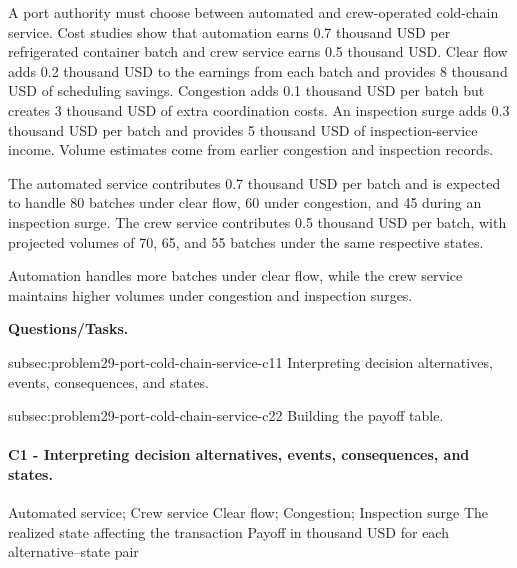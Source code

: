 	A port authority must choose between automated and crew-operated cold-chain service. Cost studies show that automation earns 0.7 thousand USD per refrigerated container batch and crew service earns 0.5 thousand USD. Clear flow adds 0.2 thousand USD to the earnings from each batch and provides 8 thousand USD of scheduling savings. Congestion adds 0.1 thousand USD per batch but creates 3 thousand USD of extra coordination costs. An inspection surge adds 0.3 thousand USD per batch and provides 5 thousand USD of inspection-service income. Volume estimates come from earlier congestion and inspection records.
	
	The automated service contributes 0.7 thousand USD per batch and is expected to handle 80 batches under clear flow, 60 under congestion, and 45 during an inspection surge. The crew service contributes 0.5 thousand USD per batch, with projected volumes of 70, 65, and 55 batches under the same respective states.
	
	 Automation handles more batches under clear flow, while the crew service maintains higher volumes under congestion and inspection surges.

	\textbf{Questions/Tasks.}
	\begin{enumerate}
	\CriterionTask
	{subsec:problem29-port-cold-chain-service-c1}{1}
	{Interpreting decision alternatives, events, consequences, and states.}

	\CriterionTask
	{subsec:problem29-port-cold-chain-service-c2}{2}
	{Building the payoff table.}
	\end{enumerate}

\paragraph*{C1 - Interpreting decision alternatives, events, consequences, and states.}
	\label{subsec:problem29-port-cold-chain-service-c1}
	\DecisionElementsTable
	{Automated service; Crew service}
	{Clear flow; Congestion; Inspection surge}
	{The realized state affecting the transaction}
	{Payoff in thousand USD for each alternative--state pair}

